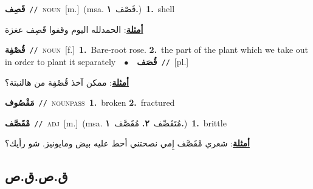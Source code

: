 \documentclass[10pt,a4paper,twoside]{article} %
\begin{document}
\begin{multicols}{2}
{\setlength\topsep{0pt}\textbf{\foreignlanguage{arabic}{قَصِف}}\ {\color{gray}\texttt{//}\color{black}}\ \textsc{noun}\ [m.]\ \color{gray}(msa. \foreignlanguage{arabic}{قَصْف}~\foreignlanguage{arabic}{\textbf{١.}})\color{black}\ \textbf{1.}~shell\  \begin{flushright}\color{gray}\foreignlanguage{arabic}{\textbf{\underline{\foreignlanguage{arabic}{أمثلة}}}: الحمدلله اليوم وقفوا قَصِف عغزة}\end{flushright}\color{black}} \vspace{2mm}

{\setlength\topsep{0pt}\textbf{\foreignlanguage{arabic}{قُصْفِة}}\ {\color{gray}\texttt{//}\color{black}}\ \textsc{noun}\ [f.]\ \textbf{1.}~Bare-root rose.  \textbf{2.}~the part of the plant which we take out in order to plant it separately\ \ $\bullet$\ \ \setlength\topsep{0pt}\textbf{\foreignlanguage{arabic}{قُصَف}}\ {\color{gray}\texttt{//}\color{black}}\ [pl.]\  \begin{flushright}\color{gray}\foreignlanguage{arabic}{\textbf{\underline{\foreignlanguage{arabic}{أمثلة}}}: ممكن آخذ قُصْفِة من هالنبتة؟}\end{flushright}\color{black}} \vspace{2mm}

{\setlength\topsep{0pt}\textbf{\foreignlanguage{arabic}{مَقْصُوف}}\ {\color{gray}\texttt{//}\color{black}}\ \textsc{noun\textunderscore pass}\ \textbf{1.}~broken  \textbf{2.}~fractured\ } \vspace{2mm}

{\setlength\topsep{0pt}\textbf{\foreignlanguage{arabic}{مْقَصَّف}}\ {\color{gray}\texttt{//}\color{black}}\ \textsc{adj}\ [m.]\ \color{gray}(msa. \foreignlanguage{arabic}{مُتَقَصِّف}~\foreignlanguage{arabic}{\textbf{٢.}}  \foreignlanguage{arabic}{مُقَصَّف}~\foreignlanguage{arabic}{\textbf{١.}})\color{black}\ \textbf{1.}~brittle\  \begin{flushright}\color{gray}\foreignlanguage{arabic}{\textbf{\underline{\foreignlanguage{arabic}{أمثلة}}}: شعري مْقَصَّف إِمي نصحتني أحط عليه بيض ومايونيز. شو رأيك؟}\end{flushright}\color{black}} \vspace{2mm}

\vspace{-3mm}
\subsection*{\color{blue}\foreignlanguage{arabic}{ق.ص.ق.ص}\color{blue}{}} 


\end{multicols}
\end{document}
